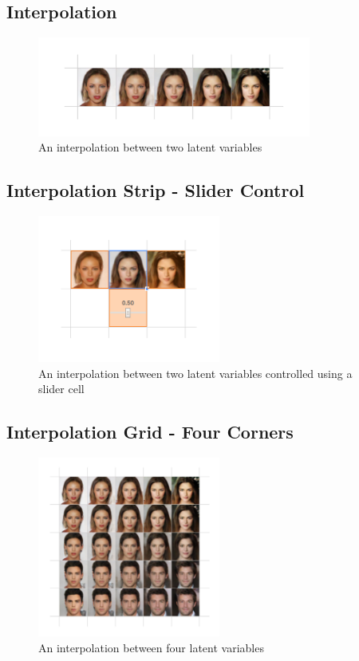 \documentclass[letterpaper]{article}
\begin{document}
\subsection{Interpolation}
\begin{figure}[ht!]
  \centering
  \includegraphics[width=9cm]{figs/04-interpolation-strip.jpg}
  \caption{An interpolation between two latent variables}
\end{figure}

\subsection{Interpolation Strip - Slider Control}
\begin{figure}[ht!]
  \centering
  \includegraphics[width=6cm]{figs/05-interpolation-by-slider.jpg}
  \caption{An interpolation between two latent variables controlled using a slider cell}
\end{figure}

\subsection{Interpolation Grid - Four Corners}
\begin{figure}[ht!]
  \centering
  \includegraphics[width=6cm]{figs/06-interpolation-grid.jpg}
  \caption{An interpolation between four latent variables}
\end{figure}
\end{document}
